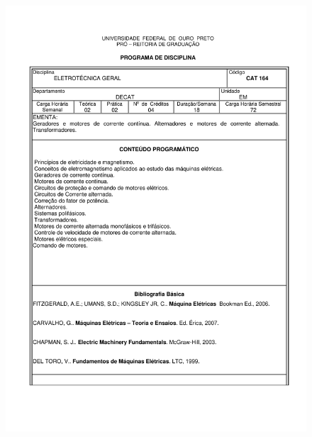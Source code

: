 \begin{figure}[p]
	\centering 
	\includegraphics[scale=0.7]{capitulos/anexo1-programas-disciplina/p54.pdf}
\end{figure}

